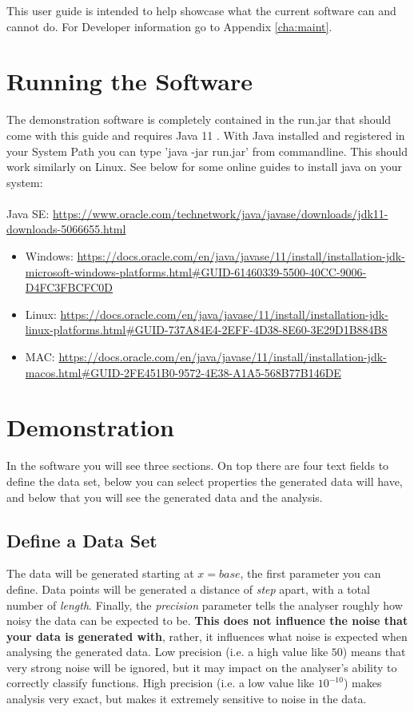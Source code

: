 \documentclass[main.tex]{subfiles}
\begin{document}
  
  This user guide is intended to help showcase what the current software can and cannot do. For Developer information go to Appendix \ref{cha:maint}.
  
  \section{Running the Software}
    
    The demonstration software is completely contained in the run.jar that should come with this guide and requires Java 11 . With Java installed and registered in your System Path you can type 'java -jar run.jar' from commandline. This should work similarly on Linux. See below for some online guides to install java on your system:
    \\\\
    Java SE: \url{https://www.oracle.com/technetwork/java/javase/downloads/jdk11-downloads-5066655.html}
    
    \begin{itemize}
      \item Windows: \url{https://docs.oracle.com/en/java/javase/11/install/installation-jdk-microsoft-windows-platforms.html#GUID-61460339-5500-40CC-9006-D4FC3FBCFC0D}
      \item Linux: \url{https://docs.oracle.com/en/java/javase/11/install/installation-jdk-linux-platforms.html#GUID-737A84E4-2EFF-4D38-8E60-3E29D1B884B8}
      \item MAC: \url{https://docs.oracle.com/en/java/javase/11/install/installation-jdk-macos.html#GUID-2FE451B0-9572-4E38-A1A5-568B77B146DE}
    \end{itemize}   
    
  \section{Demonstration}
  
    In the software you will see three sections. On top there are four text fields to define the data set, below you can select properties the generated data will have, and below that you will see the generated data and the analysis.
    
    \subsection{Define a Data Set}
    
      The data will be generated starting at $x=base$, the first parameter you can define. Data points will be generated a distance of \textit{step} apart, with a total number of \textit{length}.  Finally, the \textit{precision} parameter tells the analyser roughly how noisy the data can be expected to be. \textbf{This does not influence the noise that your data is generated with}, rather, it influences what noise is expected when analysing the generated data. Low precision (i.e. a high value like $50$) means that very strong noise will be ignored, but it may impact on the analyser's ability to correctly classify functions. High precision (i.e. a low value like $10^{-10}$) makes analysis very exact, but makes it extremely sensitive to noise in the data.
    
\end{document}
